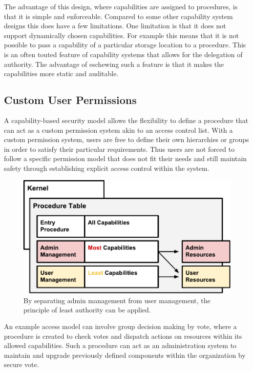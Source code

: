 \documentclass[english,a4paper]{article}
\begin{document}
The advantage of this design, where capabilities are assigned to
procedures, is that it is simple and enforceable. Compared to some other
capability system designs this does have a few limitations. One
limitation is that it does not support dynamically chosen capabilities. For
example this means that it is not possible to pass a capability of a
particular storage location to a procedure. This is an often touted
feature of capability systems that allows for the delegation of
authority. The advantage of eschewing such a feature is that it makes
the capabilities more static and auditable.

\subsection{Custom User Permissions}\label{custom-user-permissions}
A capability-based security model allows the flexibility to define a
procedure that can act as a custom permission system akin to an access
control list. With a custom permission system, users are free to define
their own hierarchies or groups in order to satisfy their particular
requirements. Thus users are not forced to follow a specific permission
model that does not fit their needs and still maintain safety through
establishing explicit access control within the system.

\begin{figure}[htbp]
\centering
\includegraphics[width=1\textwidth]{media/Separation.pdf}
\caption{By separating admin management from user management, the
principle of least authority can be applied.}
\end{figure}

An example access model can involve group decision making by vote, where
a procedure is created to check votes and dispatch actions on resources
within its allowed capabilities. Such a procedure can act as an
administration system to maintain and upgrade previously defined
components within the organization by secure vote.
\end{document}
